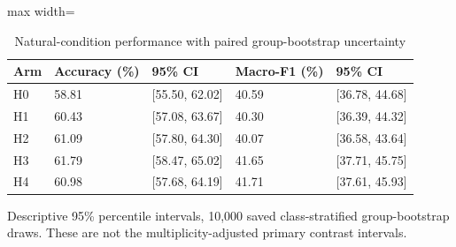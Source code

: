 \begin{table}[t]
\centering
\small
\caption{Natural-condition performance with paired group-bootstrap uncertainty}
\label{tab:06-reserved-uncertainty}
\begin{adjustbox}{max width=\textwidth}
\begin{tabular}{lllll}
\toprule
\textbf{Arm} & \textbf{Accuracy (\%)} & \textbf{95\% CI} & \textbf{Macro-F1 (\%)} & \textbf{95\% CI} \\
\midrule
H0 & 58.81 & [55.50, 62.02] & 40.59 & [36.78, 44.68] \\
H1 & 60.43 & [57.08, 63.67] & 40.30 & [36.39, 44.32] \\
H2 & 61.09 & [57.80, 64.30] & 40.07 & [36.58, 43.64] \\
H3 & 61.79 & [58.47, 65.02] & 41.65 & [37.71, 45.75] \\
H4 & 60.98 & [57.68, 64.19] & 41.71 & [37.61, 45.93] \\
\bottomrule
\end{tabular}
\end{adjustbox}
\par\smallskip
\begin{minipage}{\textwidth}\footnotesize Descriptive 95\% percentile intervals, 10,000 saved class-stratified group-bootstrap draws. These are not the multiplicity-adjusted primary contrast intervals.\end{minipage}
\end{table}
